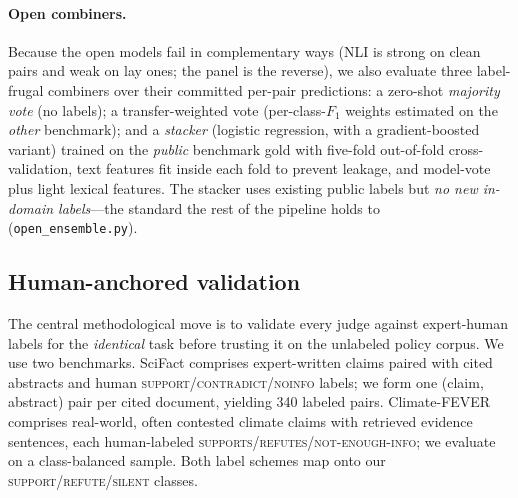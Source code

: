 \paragraph{Open combiners.} Because the open models fail in complementary ways (NLI is strong on clean
pairs and weak on lay ones; the panel is the reverse), we also evaluate three label-frugal combiners over
their committed per-pair predictions: a zero-shot \emph{majority vote} (no labels); a transfer-weighted
vote (per-class-$F_1$ weights estimated on the \emph{other} benchmark); and a \emph{stacker} (logistic
regression, with a gradient-boosted variant) trained on the \emph{public} benchmark gold with five-fold
out-of-fold cross-validation, text features fit inside each fold to prevent leakage, and model-vote plus
light lexical features. The stacker uses existing public labels but \emph{no new in-domain labels}---the
standard the rest of the pipeline holds to (\texttt{open\_ensemble.py}).

\subsection{Human-anchored validation}
\label{sec:methods-validation}
The central methodological move is to validate every judge against expert-human labels for the
\emph{identical} task before trusting it on the unlabeled policy corpus. We use two benchmarks. SciFact
\citep{wadden2020fact} comprises expert-written claims paired with cited abstracts and human
\textsc{support}/\textsc{contradict}/\textsc{noinfo} labels; we form one (claim, abstract) pair per
cited document, yielding 340 labeled pairs. Climate-FEVER \citep{diggelmann2020climate} comprises
real-world, often contested climate claims with retrieved evidence sentences, each human-labeled
\textsc{supports}/\textsc{refutes}/\textsc{not-enough-info}; we evaluate on a class-balanced sample.
Both label schemes map onto our \textsc{support}/\textsc{refute}/\textsc{silent} classes.

